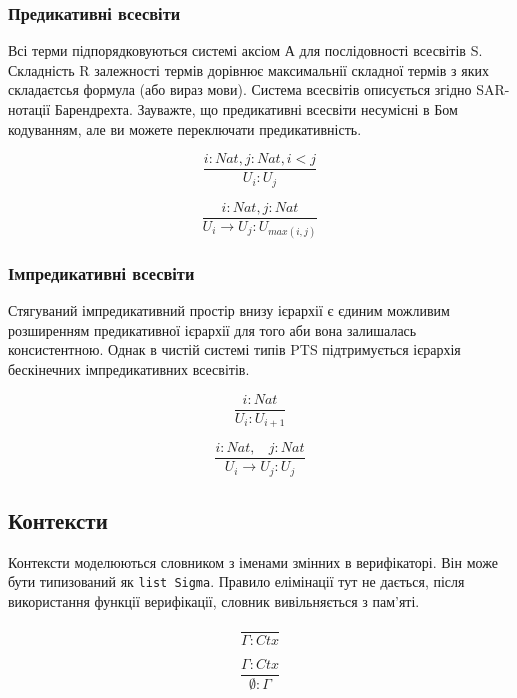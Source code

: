\subsubsection*{Предикативні всесвіти}
Всі терми підпорядковуються системі аксіом А для послідовності всесвітів S.
Складність R залежності термів дорівнює максимальнії складної термів з
яких складаєтсья формула (або вираз мови). Система всесвітів описується
згідно SAR-нотації Барендрехта. Зауважте, що предикативні всесвіти
несумісні в Бом кодуванням, але ви можете переключати предикативність.

\[
\tag{$A_1$}
\dfrac{i: Nat, j: Nat, i < j}{U_i : U_j}
\]

\[
\tag{$R_1$}
\dfrac{i : Nat, j : Nat}{U_i \rightarrow U_j : U_{max(i,j)} }
\]

\subsubsection*{Імпредикативні всесвіти}
Стягуваний імпредикативний простір внизу ієрархії є єдиним можливим розширенням
предикативної ієрархії для того аби вона залишалась консистентною. Однак
в чистій системі типів PTS підтримується ієрархія бескінечних імпредикативних всесвітів.

\begin{equation}
\tag{$A_2$}
\dfrac
{i: Nat}
{U_i : U_{i+1}}
\end{equation}

\begin{equation}
\tag{$R_2$}
\dfrac
{i : Nat,\ \ \ \ j : Nat}
{U_i \rightarrow U_{j} : U_{j}}
\end{equation}

\subsection{Контексти}

Контексти моделюються словником з іменами змінних в верифікаторі.
Він може бути типизований як \lstinline{list Sigma}.
Правило елімінації тут не дається, після використання функції верифікації,
словник вивільняється з пам'яті.

\begin{equation}
\tag{Ctx-formation}
\dfrac
{}
{\Gamma : Ctx}
\end{equation}

\begin{equation}
\tag{Ctx-intro$_1$}
\dfrac
{\Gamma : Ctx}
{\emptyset : \Gamma}
\end{equation}

